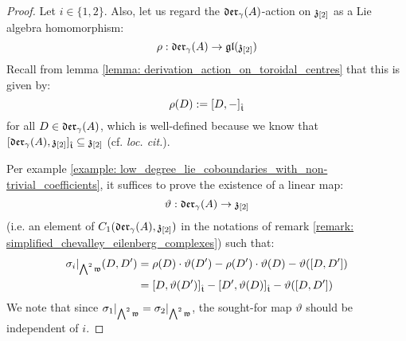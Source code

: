             \begin{proof}
                Let $i \in \{1, 2\}$. Also, let us regard the $\mathfrak{der}_{\gamma}(A)$-action on $\mathfrak{z}_{[2]}$ as a Lie algebra homomorphism:
                    $$\rho: \mathfrak{der}_{\gamma}(A) \to \mathfrak{gl}( \mathfrak{z}_{[2]} )$$
                Recall from lemma \ref{lemma: derivation_action_on_toroidal_centres} that this is given by:
                    $$\rho(D) := [D, -]_{\hat{\mathfrak{t}}}$$
                for all $D \in \mathfrak{der}_{\gamma}(A)$, which is well-defined because we know that $[\mathfrak{der}_{\gamma}(A), \mathfrak{z}_{[2]}]_{\hat{\mathfrak{t}}} \subseteq \mathfrak{z}_{[2]}$ (cf. \textit{loc. cit.}).
            
                Per example \ref{example: low_degree_lie_coboundaries_with_non-trivial_coefficients}, it suffices to prove the existence of a linear map:
                    $$\vartheta: \mathfrak{der}_{\gamma}(A) \to \mathfrak{z}_{[2]}$$
                (i.e. an element of $C_1(\mathfrak{der}_{\gamma}(A), \mathfrak{z}_{[2]})$ in the notations of remark \ref{remark: simplified_chevalley_eilenberg_complexes}) such that:
                    $$
                        \begin{aligned}
                            \sigma_i|_{\bigwedge^2 \mathfrak{w}}(D, D') & = \rho(D) \cdot \vartheta(D') - \rho(D') \cdot \vartheta(D) - \vartheta([D, D'])
                            \\
                            & = [D, \vartheta(D')]_{\hat{\mathfrak{t}}} - [D', \vartheta(D)]_{\hat{\mathfrak{t}}} - \vartheta([D, D'])
                        \end{aligned}
                    $$
                We note that since $\sigma_1|_{\bigwedge^2 \mathfrak{w}} = \sigma_2|_{\bigwedge^2 \mathfrak{w}}$, the sought-for map $\vartheta$ should be independent of $i$. 
                    

\end{proof}
